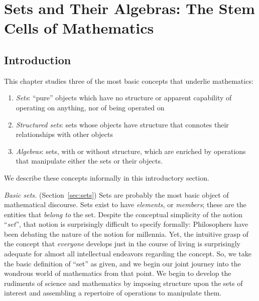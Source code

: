 
\chapter{Sets and Their Algebras:
The Stem Cells of Mathematics}
\label{ch:sets-BA-logic}

\section{Introduction}

This chapter studies three of the most basic concepts that underlie mathematics:
\begin{enumerate}
\item
{\em Sets}: ``pure'' objects which have no structure or apparent capability of operating on anything, nor of being operated on
\item
{\em Structured sets}: sets whose objects have structure that connotes their relationships with other objects
\item
{\em Algebras}: sets, with or without structure, which are enriched by operations that manipulate either the sets or their objects.
\end{enumerate}
We describe these concepts informally in this introductory section.

\bigskip

   
{\it Basic sets.}  (Section~\ref{sec:sets})  Sets are probably the most basic object of mathematical discourse.  Sets exist to have {\it elements},  or {\it members}; these are the entities that {\em belong to} the set.  Despite the conceptual simplicity of the notion ``{\it set}'', that notion is surprisingly difficult to specify formally: Philosophers have been debating the
nature of the notion for millennia.  Yet, the intuitive grasp of the concept that {\em everyone} develops just in the course of living is surprisingly adequate for almost all intellectual endeavors regarding the concept.  So, we take the basic definition of ``set'' as given, and we begin our joint journey into the wondrous world of mathematics from that point.  We begin to develop the rudiments of science and mathematics by imposing structure upon the sets of interest and assembling a repertoire of operations to manipulate them.

